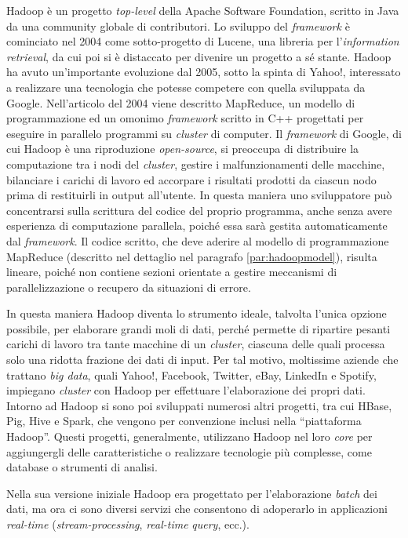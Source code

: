 Hadoop è un progetto \textit{top-level} della Apache Software Foundation, scritto in Java da una community globale di contributori. Lo sviluppo del \textit{framework} è cominciato nel 2004 come 
sotto-progetto di Lucene, una libreria per l’\textit{information retrieval}, da cui poi si è distaccato per divenire un progetto a sé stante. Hadoop ha avuto un’importante evoluzione dal
2005, sotto la spinta di Yahoo!, interessato a realizzare una tecnologia che potesse competere con quella sviluppata da Google. Nell’articolo del 2004 viene descritto MapReduce,
un modello di programmazione ed un omonimo \textit{framework} scritto in C++ progettati per eseguire in parallelo programmi su \textit{cluster} di computer. Il \textit{framework} di Google, di cui Hadoop 
è una riproduzione \textit{open-source}, si preoccupa di distribuire la computazione tra i nodi del \textit{cluster}, gestire i malfunzionamenti delle macchine, bilanciare i carichi di lavoro ed 
accorpare i risultati prodotti da ciascun nodo prima di restituirli in output all’utente. In questa maniera uno sviluppatore può concentrarsi sulla scrittura del codice del 
proprio programma, anche senza avere esperienza di computazione parallela, poiché essa sarà gestita automaticamente dal \textit{framework}. Il codice scritto, che deve aderire al modello 
di programmazione MapReduce (descritto nel dettaglio nel paragrafo \ref{par:hadoopmodel}), risulta lineare, poiché non contiene sezioni orientate a gestire meccanismi di parallelizzazione o 
recupero da situazioni di errore. 

In questa maniera Hadoop diventa lo strumento ideale, talvolta l’unica opzione possibile, per elaborare grandi moli di dati, perché permette di ripartire pesanti carichi di 
lavoro tra tante macchine di un \textit{cluster}, ciascuna delle quali processa solo una ridotta frazione dei dati di input. Per tal motivo, moltissime 
aziende \cite{URL:usinghadoop} che trattano \textit{big data}, quali Yahoo!, Facebook, Twitter, eBay, LinkedIn e Spotify, impiegano \textit{cluster} con Hadoop per effettuare 
l’elaborazione dei propri dati. Intorno ad Hadoop si sono poi sviluppati numerosi altri progetti, tra cui HBase, Pig, Hive e Spark, che vengono per convenzione inclusi nella
“piattaforma Hadoop”. Questi progetti, generalmente, utilizzano Hadoop nel loro \textit{core} per aggiungergli delle caratteristiche o realizzare tecnologie più complesse, come database 
o strumenti di analisi. 

Nella sua versione iniziale Hadoop era progettato per l’elaborazione \textit{batch} dei dati, ma ora ci sono diversi servizi che consentono di adoperarlo in applicazioni \textit{real-time} 
(\textit{stream-processing}, \textit{real-time} \textit{query}, ecc.). 

